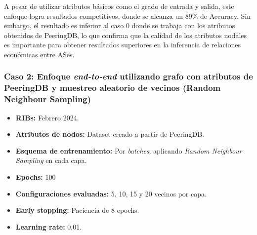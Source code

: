 A pesar de utilizar atributos básicos como el grado de entrada y salida, este enfoque logra resultados competitivos, donde se alcanza un 89\% de Accuracy. Sin embargo, el resultado es inferior al caso 0 donde se trabaja con los atributos obtenidos de PeeringDB, lo que confirma que la calidad de los atributos  nodales es importante para obtener resultados superiores en la inferencia de relaciones económicas entre ASes. 




\subsubsection{Caso 2: Enfoque \textit{end-to-end} utilizando grafo con atributos de PeeringDB y muestreo aleatorio de vecinos (Random Neighbour Sampling)}

\begin{itemize}
    \item \textbf{RIBs:} Febrero 2024.
    \item \textbf{Atributos de nodos:} Dataset creado a partir de PeeringDB.
    \item \textbf{Esquema de entrenamiento:} Por \textit{batches}, aplicando \textit{Random Neighbour Sampling} en cada capa.
    \item \textbf{Epochs:}  100
    \item \textbf{Configuraciones evaluadas:} 5, 10, 15 y 20 vecinos por capa.
    \item \textbf{Early stopping:} Paciencia de 8 epochs.
    \item \textbf{Learning rate:} 0,01.
\end{itemize}








